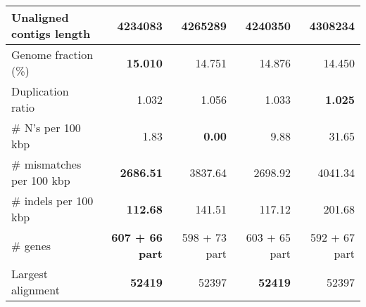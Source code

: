 \documentclass[12pt,a4paper]{article}
\begin{document}
\begin{table}[ht]
\begin{center}
\begin{tabular}{|l*{4}{|r}|}
Unaligned contigs length & {\bf 4234083} & 4265289 & 4240350 & 4308234 \\ \hline
Genome fraction (\%) & {\bf 15.010} & 14.751 & 14.876 & 14.450 \\ \hline
Duplication ratio & 1.032 & 1.056 & 1.033 & {\bf 1.025} \\ \hline
\# N's per 100 kbp & 1.83 & {\bf 0.00} & 9.88 & 31.65 \\ \hline
\# mismatches per 100 kbp & {\bf 2686.51} & 3837.64 & 2698.92 & 4041.34 \\ \hline
\# indels per 100 kbp & {\bf 112.68} & 141.51 & 117.12 & 201.68 \\ \hline
\# genes & {\bf 607 + 66 part} & 598 + 73 part & 603 + 65 part & 592 + 67 part \\ \hline
Largest alignment & {\bf 52419} & 52397 & {\bf 52419} & 52397 \\ \hline
\end{tabular}
\end{center}
\end{table}
\end{document}
